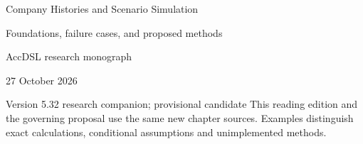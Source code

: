 \documentclass[11pt,a4paper]{report}
\begin{document}
\hypersetup{pageanchor=false}
\begin{titlepage}
{\Huge Company Histories and Scenario Simulation\par}
\vspace{12mm}
{\Large Foundations, failure cases, and proposed methods\par}
\vspace{8mm}
AccDSL research monograph\par 27 October 2026\par Version 5.32 research companion; provisional candidate
\vfill
This reading edition and the governing proposal use the same new chapter sources. Examples distinguish exact calculations, conditional assumptions and unimplemented methods.
\end{titlepage}
\hypersetup{pageanchor=true}
\tableofcontents
\clearpage{}


























\clearpage\label{sim:body-end}

\begingroup\raggedright
\endgroup
\end{document}
